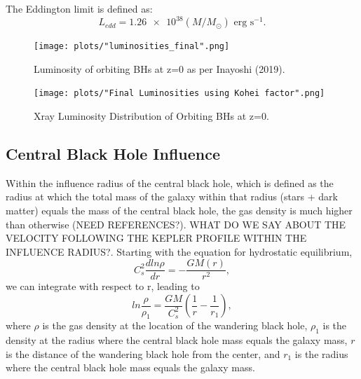 \documentclass[english, apj]{emulateapj}
\begin{document}
The Eddington limit is defined as:
\begin{equation}
    L_{edd} = \num{1.26e38} (M/M_{\odot}) \text{  erg s}^{-1}.
\end{equation}


\begin{figure}[ht]
\begin{center}
\texttt{[image: plots/"luminosities\_final".png]}
\caption{Luminosity of orbiting BHs at z=0 as per Inayoshi (2019).}
\label{fig:loobhs}
\end{center}
\end{figure}

\begin{figure}[ht]
\begin{center}
\texttt{[image: plots/"Final Luminosities using Kohei factor".png]}
\caption{Xray Luminosity Distribution of Orbiting BHs at z=0.}
\label{fig:ldobhs}
\end{center}
\end{figure}


\subsection{Central Black Hole Influence}
Within the influence radius of the central black hole, which is defined as the radius at which the total mass of the galaxy within that radius (stars + dark matter) equals the mass of the central black hole, the gas density is much higher than otherwise (NEED REFERENCES?).  {WHAT DO WE SAY ABOUT THE VELOCITY FOLLOWING THE KEPLER PROFILE WITHIN THE INFLUENCE RADIUS?}.  Starting with the equation for hydrostatic equilibrium, 
\begin{equation}
    C_{s}^2\frac{dln\rho}{dr}= -\frac{GM(r)}{r^2},
\end{equation}
we can integrate with respect to r, leading to 
\begin{equation}
    ln\frac{\rho}{\rho_1} = \frac{GM}{C_{s}^2}\left(\frac{1}{r} - \frac{1}{r_1}\right),
\end{equation}
where $\rho$ is the gas density at the location of the wandering black hole, $\rho_1$ is the density at the radius where the central black hole mass equals the galaxy mass, $r$ is the distance of the wandering black hole from the center, and $r_1$ is the radius where the central black hole mass equals the galaxy mass.
\end{document}
